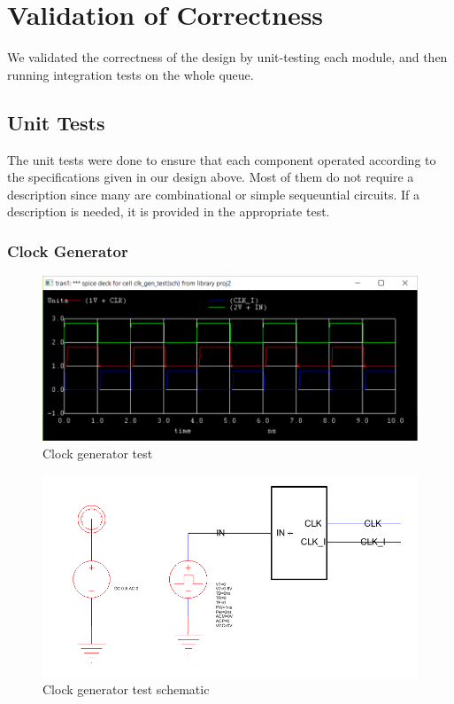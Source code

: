 \documentclass[12pt]{report}
\begin{document}
\newpage
\section*{Validation of Correctness}
We validated the correctness of the design by unit-testing each module, and then running integration tests on the whole queue.

\subsection*{Unit Tests}
The unit tests were done to ensure that each component operated according to the specifications given in our design above. Most of them do not require a description since many are combinational or simple sequeuntial circuits. If a description is needed, it is provided in the appropriate test.
\subsubsection*{Clock Generator}
\begin{figure}[H]
  \centering
    \includegraphics[width=1.0\textwidth]{clk_gen_test.PNG}
  \caption{Clock generator test}
  \label{fig:clk_gen_test}
\end{figure}
\begin{figure}[H]
  \centering
    \includegraphics[width=1.0\textwidth]{TestSchematics/clk_gen.PNG}
  \caption{Clock generator test schematic}
\end{figure}
\end{document}
